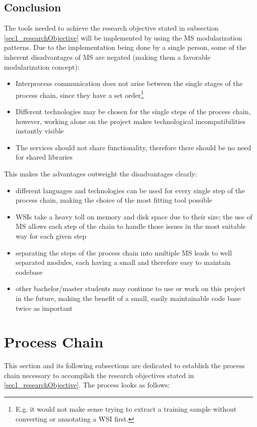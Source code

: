 \subsection{Conclusion}	
The tools needed to achieve the research objective stated in subsection \ref{sec1_researchObjective} will be implemented by using the MS modularization patterns. Due to the implementation being done by a single person, some of the inherent disadvantages of MS are negated (making them a favorable modularization concept):
\begin{itemize}
	\item Interprocess communication does not arise between the single stages of the process chain, since they have a set order\footnote{E.g. it would not make sense trying to extract a training sample without converting or annotating a WSI first.}
	\item Different technologies may be chosen for the single steps of the process chain, however, working alone on the project makes technological incompatibilities instantly visible
	\item The services should not share functionality, therefore there should be no need for shared libraries
\end{itemize}
This makes the advantages outweight the disadvantages clearly:
\begin{itemize}
	\item different languages and technologies can be used for every single step of the process chain, making the choice of the most fitting tool possible
	\item WSIs take a heavy toll on memory and disk space due to their size; the use of MS allows each step of the chain to handle those issues in the most suitable way for each given step
	\item separating the steps of the process chain into multiple MS leads to well separated modules, each having a small and therefore easy to maintain codebase
	\item other bachelor/master students may continue to use or work on this project in the future, making the benefit of a small, easily maintainable code base twice as important
\end{itemize}


\section{Process Chain}
\label{sec2_pc}
This section and its following subsections are dedicated to establish the process chain necessary to accomplish the research objectives stated in \ref{sec1_researchObjective}. The process looks as follows:

